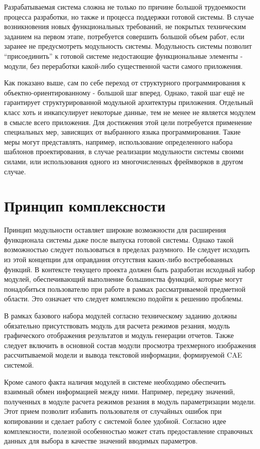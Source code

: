 \documentclass[14pt,oneside,final]{extreport}
\begin{document}
	Разрабатываемая система сложна не только по причине большой трудоемкости процесса разработки, но также и процесса поддержки готовой системы. В случае возникновения новых функциональных требований, не покрытых техническим заданием на первом этапе, потребуется совершить большой объем работ, если заранее не предусмотреть модульность системы. Модульность системы позволит “присоединить” к готовой системе недостающие функциональные элементы - модули, без переработки какой-либо существенной части самого приложения. 
	
	Как показано выше, сам по себе переход от структурного программирования к объектно-ориентированному - большой шаг вперед. Однако, такой шаг ещё не гарантирует структурированной модульной архитектуры приложения. Отдельный класс хоть и инкапсулирует некоторые данные, тем не менее не является модулем в смысле всего приложения. Для достижения этой цели потребуется применение специальных мер, зависящих от выбранного языка программирования. Такие меры могут представлять, например, использование определенного набора шаблонов проектирования, в случае реализации модульности системы своими силами, или использования одного из многочисленных фреймворков в другом случае.  

	
	
	\section{Принцип комплексности}
	    Принцип модульности оставляет широкие возможности для расширения функционала системы даже после выпуска готовой системы. Однако такой возможностью следует пользоваться в пределах разумного. Не следует исходить из этой концепции для оправдания отсутствия каких-либо востребованных функций. В контексте текущего проекта должен быть разработан исходный набор модулей, обеспечивающий выполнение большинства функций, которые могут понадобиться пользователю при работе в рамках рассматриваемой предметной области. Это означает что следует комплексно подойти к решению проблемы. 
	    
	    В рамках базового набора модулей согласно техническому заданию должны обязательно присутствовать модуль для расчета режимов резания, модуль графического отображения результатов и модуль генерации отчетов. Также следует включить в основной состав модули просмотра трехмерного изображения рассчитываемой модели и вывода текстовой информации, формируемой CAE системой. 
	    
	    Кроме самого факта наличия модулей в системе необходимо обеспечить взаимный обмен информацией между ними. Например, передачу значений, полученных в модуле расчета режимов резания в модуль параметризации модели. Этот прием позволит избавить пользователя от случайных ошибок при копировании и сделает работу с системой более удобной. Согласно идее комплексности, полезной особенностью может стать предоставление справочных данных для выбора в качестве значений вводимых параметров. 
	    
\end{document}
